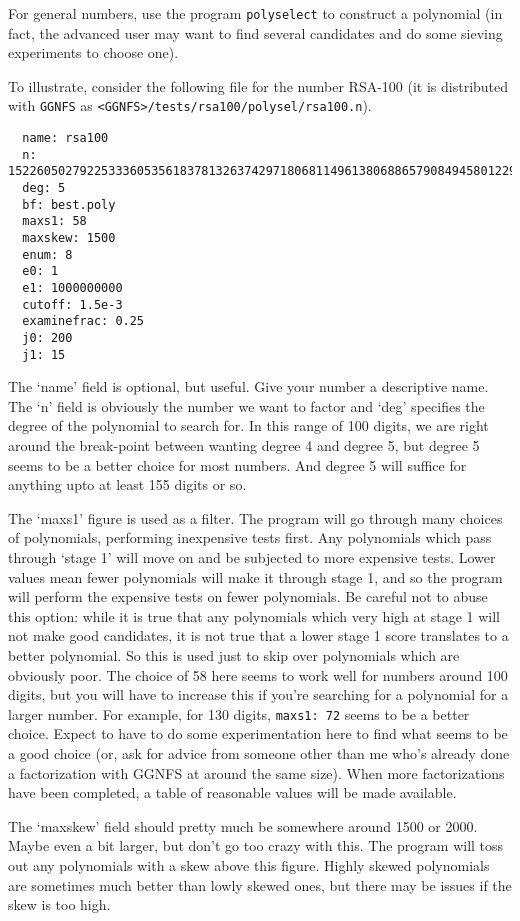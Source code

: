 \documentclass[12pt]{article}
\begin{document}
  For general numbers, use the program {\tt polyselect}
  to construct a polynomial (in fact, the advanced user may
  want to find several candidates and do some sieving experiments
  to choose one).

  To illustrate, consider the following file for the number
  RSA-100 (it is distributed with {\tt GGNFS} as
  \verb~<GGNFS>/tests/rsa100/polysel/rsa100.n~).
  \begin{verbatim} 
  name: rsa100
  n: 1522605027922533360535618378132637429718068114961380688657908494580122963258952897654000350692006139
  deg: 5
  bf: best.poly
  maxs1: 58
  maxskew: 1500
  enum: 8
  e0: 1
  e1: 1000000000
  cutoff: 1.5e-3
  examinefrac: 0.25
  j0: 200
  j1: 15
  \end{verbatim}

  The `name' field is optional, but useful. Give your number a descriptive
  name. The `n' field is obviously the number we want to factor and `deg'
  specifies the degree of the polynomial to search for. In this range of
  100 digits, we are right around the break-point between wanting degree
  4 and degree 5, but degree 5 seems to be a better choice for most numbers.
  And degree 5 will suffice for anything upto at least 155 digits or so.

  The `maxs1' figure is used as a filter. The program will go through many
  choices of polynomials, performing inexpensive tests first. Any polynomials
  which pass through `stage 1' will move on and be subjected to more expensive
  tests. Lower values mean fewer polynomials will make it through stage 1,
  and so the program will perform the expensive tests on fewer polynomials.
  Be careful not to abuse this option: while it is true that any polynomials
  which very high at stage 1 will not make good candidates, it is not
  true that a lower stage 1 score translates to a better polynomial. So this
  is used just to skip over polynomials which are obviously poor. The choice
  of 58 here seems to work well for numbers around 100 digits, but you will
  have to increase this if you're searching for a polynomial for a larger number.
  For example, for 130 digits, {\tt maxs1: 72} seems to be a better choice.
  Expect to have to do some experimentation here to find what seems to be a good
  choice (or, ask for advice from someone other than me who's already done a
  factorization with GGNFS at around the same size). When more factorizations
  have been completed, a table of reasonable values will be made available.

  The `maxskew' field should pretty much be somewhere around 1500 or 2000. Maybe
  even a bit larger, but don't go too crazy with this. The program will toss
  out any polynomials with a skew above this figure. Highly skewed polynomials
  are sometimes much better than lowly skewed ones, but there may be issues if
  the skew is too high.
\end{document}

